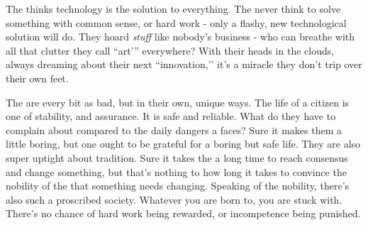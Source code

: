 \documentclass[blue]{GL2020}
\begin{document}
The \pTech{} thinks technology is the solution to everything. The \pTechies{} never think to solve something with common sense, or hard work - only a flashy, new technological solution will do. They hoard \emph{stuff} like nobody’s business - who can breathe with all that clutter they call ``art’” everywhere? With their heads in the clouds, always dreaming about their next ``innovation,’’ it’s a miracle they don’t trip over their own feet.

The \pFarm{} are every bit as bad, but in their own, unique ways. The life of a \pFarm{} citizen is one of stability, and assurance. It is safe and reliable. What do they have to complain about compared to the daily dangers a \pShippie{} faces? Sure it makes them a little boring, but one ought to be grateful for a boring but safe life. They are also super uptight about tradition. Sure it takes the \pShip{} a long time to reach consensus and change something, but that’s nothing to how long it takes to convince the nobility of the \pFarm{} that something needs changing. Speaking of the nobility, there’s also such a proscribed society. Whatever you are born to, you are stuck with. There’s no chance of hard work being rewarded, or incompetence being punished.
\end{document}
